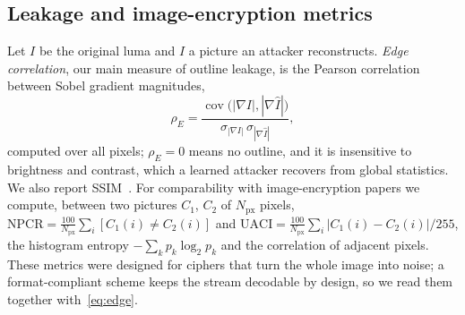 \subsection{Leakage and image-encryption metrics}\label{sec:metrics}
Let $I$ be the original luma and $\hat I$ a picture an attacker reconstructs. \emph{Edge correlation}, our main measure of outline leakage, is the Pearson correlation between Sobel gradient magnitudes,
\begin{equation}
\rho_E = \frac{\operatorname{cov}\bigl(|\nabla I|, |\nabla \hat I|\bigr)}{\sigma_{|\nabla I|}\,\sigma_{|\nabla \hat I|}},
\label{eq:edge}
\end{equation}
computed over all pixels; $\rho_E = 0$ means no outline, and it is insensitive to brightness and contrast, which a learned attacker recovers from global statistics. We also report SSIM~\cite{ssim}. For comparability with image-encryption papers we compute, between two pictures $C_1$, $C_2$ of $N_{\mathrm{px}}$ pixels, $\mathrm{NPCR} = \frac{100}{N_{\mathrm{px}}} \sum_{i} [C_1(i) \ne C_2(i)]$ and $\mathrm{UACI} = \frac{100}{N_{\mathrm{px}}} \sum_{i} |C_1(i) - C_2(i)| / 255$, the histogram entropy $-\sum_k p_k \log_2 p_k$ and the correlation of adjacent pixels. These metrics were designed for ciphers that turn the whole image into noise; a format-compliant scheme keeps the stream decodable by design, so we read them together with~\eqref{eq:edge}.
